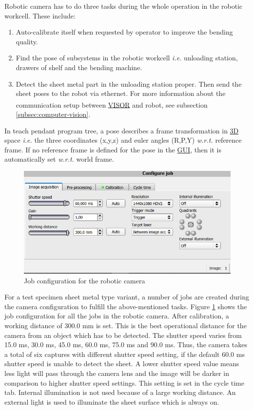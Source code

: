 Robotic camera has to do three tasks during the whole operation in the robotic workcell. These include:
\begin{enumerate}
    \item Auto-calibrate itself when requested by operator to improve the bending quality.
    \item Find the pose of subsystems in the robotic workcell \textit{i.e.} unloading station, drawers of shelf and the bending machine.
    \item Detect the sheet metal part in the unloading station proper. Then send the sheet poses to the robot via ethernet. For more information about the communication setup between \hyperref[acro:VISOR]{VISOR}\textsuperscript{\textregistered} and robot, see subsection \ref{subsec:computer-vision}.
\end{enumerate}



In teach pendant program tree, a pose describes a frame transformation in \hyperref[acro:3D]{3D} space \textit{i.e.} the three coordinates (x,y,z) and euler angles (R,P,Y) \textit{w.r.t.} reference frame. If no reference frame is defined for the pose in the \hyperref[acro:GUI]{GUI}, then it is automatically set \textit{w.r.t.} world frame.

\begin{figure}[h]
    \centering
    \includegraphics[width=\textwidth]{figures/job-configuration.png}
    \caption{Job configuration for the robotic camera}
    \label{fig:job-configuration-robotic}
\end{figure}

For a test specimen sheet metal type variant, a number of jobs are created during the camera configuration to fulfill the above-mentioned tasks.
Figure \ref{fig:job-configuration-robotic} shows the job configuration for all the jobs in the robotic camera.
After calibration, a working distance of 300.0 mm is set. This is the best operational distance for the camera from an object which has to be detected. The shutter speed varies from 15.0 ms, 30.0 ms, 45.0 ms, 60.0 ms, 75.0 ms and 90.0 ms. Thus, the camera takes a total of six captures with different shutter speed setting, if the default 60.0 ms shutter speed is unable to detect the sheet. A lower shutter speed value means less light will pass through the camera lens and the image will be darker in comparison to higher shutter speed settings. This setting is set in the cycle time tab.
Internal illumination is not used because of a large working distance. An external light is used to illuminate the sheet surface which is always on.


